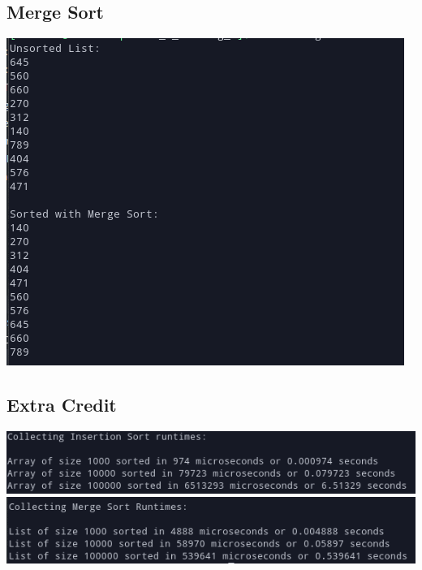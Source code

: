 \documentclass{article}
\begin{document}
    \subsection{Merge Sort}
    \includegraphics[]{mergeSort.png}
    \subsection{Extra Credit}
    \includegraphics[]{insertionRuntime.png}\\
    \includegraphics[]{mergeRuntime.png}
\end{document}
